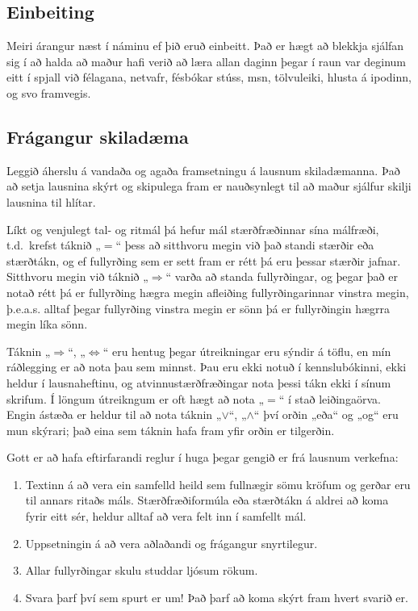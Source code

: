 \documentclass[a4paper,10pt,icelandic]{sphinxmanual}
\begin{document}
\subsection{Einbeiting}
\label{\detokenize{vidauki:einbeiting}}
Meiri árangur næst í náminu ef þið eruð einbeitt.
Það er hægt að blekkja sjálfan sig í að halda að maður hafi verið að
læra allan daginn þegar í raun var deginum eitt í spjall við félagana,
netvafr, fésbókar stúss, msn, tölvuleiki, hlusta á ipodinn, og
svo framvegis.


\subsection{Frágangur skiladæma}
\label{\detokenize{vidauki:id1}}
Leggið áherslu á vandaða og agaða framsetningu á lausnum
skiladæmanna.  Það að setja lausnina skýrt og skipulega fram er
nauðsynlegt til að maður sjálfur skilji lausnina til hlítar.

Líkt og venjulegt tal- og ritmál þá hefur mál stærðfræðinnar sína
málfræði, t.d. krefst táknið „\(=\)“ þess að sitthvoru megin við
það standi stærðir eða stærðtákn, og ef fullyrðing sem er sett fram er
rétt þá eru þessar stærðir jafnar. Sitthvoru megin við táknið
„\(\Rightarrow\)“ varða að standa fullyrðingar, og þegar það er
notað rétt þá er fullyrðing hægra megin afleiðing fullyrðingarinnar
vinstra megin, þ.e.a.s. alltaf þegar fullyrðing vinstra megin er sönn þá
er fullyrðingin hægrra megin líka sönn.

Táknin „\(\Rightarrow\)“, „\(\Leftrightarrow\)“ eru hentug
þegar útreikningar eru sýndir á töflu, en mín ráðlegging er að nota þau
sem minnst. Þau eru ekki notuð í kennslubókinni, ekki heldur í
lausnaheftinu, og atvinnustærðfræðingar nota þessi tákn ekki í sínum
skrifum. Í löngum útreikngum er oft hægt að nota „\(=\)“ í stað
leiðingaörva. Engin ástæða er heldur til að nota táknin
„\(\vee\)“, „\(\wedge\)“ því orðin „eða“ og „og“ eru mun
skýrari; það eina sem táknin hafa fram yfir orðin er tilgerðin.

Gott er að hafa eftirfarandi reglur í huga þegar gengið er frá lausnum
verkefna:
\begin{enumerate}
\item {} 
Textinn á að vera ein samfelld heild sem fullnægir sömu kröfum og
gerðar eru til annars ritaðs máls. Stærðfræðiformúla eða stærðtákn á
aldrei að koma fyrir eitt sér, heldur alltaf að vera felt inn í samfellt
mál.

\item {} 
Uppsetningin á að vera aðlaðandi og frágangur snyrtilegur.

\item {} 
Allar fullyrðingar skulu studdar ljósum rökum.

\item {} 
Svara þarf því sem spurt er um! Það þarf að koma skýrt fram hvert
svarið er.

\end{enumerate}
\end{document}
